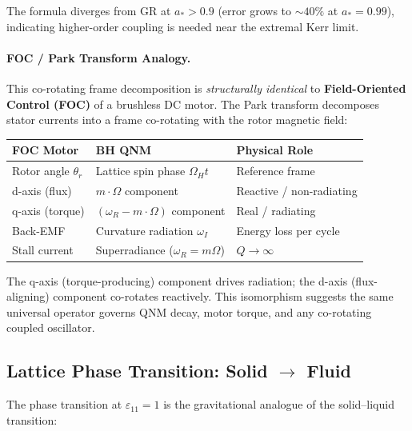\noindent The formula diverges from GR at $a_* > 0.9$ (error grows to $\sim\!40\%$ at $a_* = 0.99$), indicating higher-order coupling is needed near the extremal Kerr limit.

\paragraph{FOC / Park Transform Analogy.}
This co-rotating frame decomposition is \textit{structurally identical} to \textbf{Field-Oriented Control (FOC)} of a brushless DC motor.  The Park transform decomposes stator currents into a frame co-rotating with the rotor magnetic field:
\begin{center}
\renewcommand{\arraystretch}{1.3}
\begin{tabular}{l l l}
\toprule
\textbf{FOC Motor} & \textbf{BH QNM} & \textbf{Physical Role} \\
\midrule
Rotor angle $\theta_r$ & Lattice spin phase $\Omega_H t$ & Reference frame \\
d-axis (flux) & $m \cdot \Omega$ component & Reactive / non-radiating \\
q-axis (torque) & $(\omega_R - m \cdot \Omega)$ component & Real / radiating \\
Back-EMF & Curvature radiation $\omega_I$ & Energy loss per cycle \\
Stall current & Superradiance ($\omega_R = m\Omega$) & $Q \to \infty$ \\
\bottomrule
\end{tabular}
\end{center}
\noindent The q-axis (torque-producing) component drives radiation; the d-axis (flux-aligning) component co-rotates reactively.  This isomorphism suggests the same universal operator governs QNM decay, motor torque, and any co-rotating coupled oscillator.

\subsection{Lattice Phase Transition: Solid $\to$ Fluid}

The phase transition at $\varepsilon_{11} = 1$ is the gravitational analogue of the solid--liquid transition:

